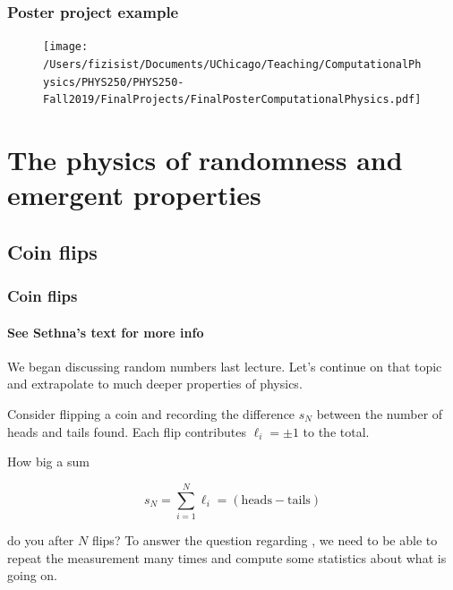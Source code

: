 \documentclass[hyperref={colorlinks=true}]{beamer}
\begin{document}

\begin{frame}%
  \frametitle{Poster project example}
  
  \begin{figure}
    \texttt{[image: /Users/fizisist/Documents/UChicago/Teaching/ComputationalPhysics/PHYS250/PHYS250-Fall2019/FinalProjects/FinalPosterComputationalPhysics.pdf]}
  \end{figure}
  
\end{frame}

\section[The physics of randomness and emergent properties]{The physics of randomness and emergent properties}

\subsection[Coin flips]{Coin flips}

\begin{frame}%
  \frametitle{Coin flips}
  \framesubtitle{See Sethna's text for more info}
  
  We began discussing random numbers last lecture. Let's continue on that topic and extrapolate to much deeper properties of physics.
  
  \vspace{1cm}
  
  Consider flipping a coin and recording the difference $s_N$ between the number of heads and tails found. Each flip contributes $\ell_i = \pm 1$ to the total. 
  
  How big a sum 
  
  \begin{equation} 
    s_N = \sum_{i=1}^{N} \ell_i = \mathrm{(heads - tails)} 
  \end{equation}
  
  do you  after $N$ flips? To answer the question regarding , we need to be able to repeat the measurement many times and compute some statistics about what is going on.
  
\end{frame}
\end{document}
